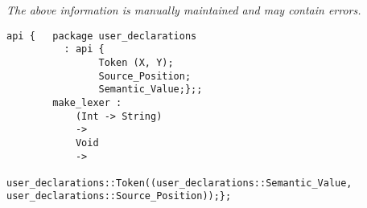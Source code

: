 \label{api:Lexer}

{\tiny \it The above information is manually maintained and may contain errors.}
\begin{verbatim}
api {   package user_declarations
          : api {
                Token (X, Y);
                Source_Position;
                Semantic_Value;};;
        make_lexer :
            (Int -> String)
            ->
            Void
            ->
            user_declarations::Token((user_declarations::Semantic_Value, user_declarations::Source_Position));};
\end{verbatim}
